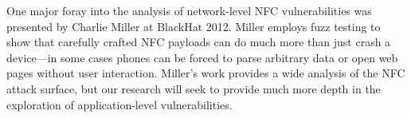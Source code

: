 \documentclass[12pt]{article}
\begin{document}
One major foray into the analysis of network-level NFC vulnerabilities was presented by Charlie Miller at BlackHat 2012\cite{miller2012}.
Miller employs fuzz testing to show that carefully crafted NFC payloads can do much more than just crash a device---in some cases phones can be forced to parse arbitrary data or open web pages without user interaction.
Miller's work provides a wide analysis of the NFC attack surface, but our research will seek to provide much more depth in the exploration of application-level vulnerabilities.
\end{document}
